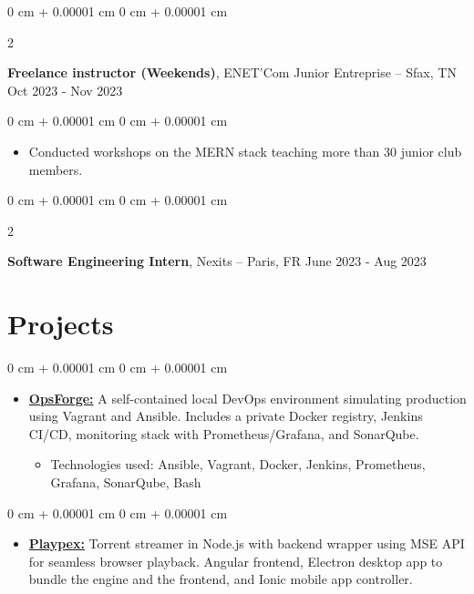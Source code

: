 \documentclass[10pt, letterpaper]{article}
\newenvironment{highlights}{
  \begin{itemize}[
    topsep=0.10 cm,
    parsep=0.10 cm,
    partopsep=0pt,
    itemsep=0pt,
    leftmargin=0 cm + 10pt
    ]
  }{
\end{itemize}
}
\newenvironment{highlightsforbulletentries}{
  \begin{itemize}[
    topsep=0 cm,
    parsep=0.10 cm,
    partopsep=0pt,
    itemsep=0pt,
    leftmargin=10pt
    ]
  }{
\end{itemize}
} %
\newenvironment{onecolentry}{
  \begin{adjustwidth}{
      0 cm + 0.00001 cm
    }{
      0 cm + 0.00001 cm
    }
  }{
  \end{adjustwidth}
} %
\newenvironment{twocolentry}[2][]{
  \onecolentry
  \def\secondColumn{#2}
  \setcolumnwidth{\fill, 4.5 cm}
  \begin{paracol}{2}
  }{
    \switchcolumn \raggedleft \secondColumn
  \end{paracol}
  \end{onecolentry}
} %
\begin{document}
    \begin{twocolentry}{
      Oct 2023 - Nov 2023
    }
  \textbf{Freelance instructor (Weekends)}, ENET’Com Junior Entreprise  -- Sfax, TN\end{twocolentry}

  \vspace{0.10 cm}
  \begin{onecolentry}
    \begin{highlights}

    \item Conducted workshops on the MERN stack teaching more than 30 junior club members.


    \end{highlights}

  \end{onecolentry}




  \begin{twocolentry}{
      June 2023 - Aug 2023
    }
  \textbf{Software Engineering Intern}, Nexits  -- Paris, FR\end{twocolentry}



\section{Projects}

\vspace{0.2 cm}

\begin{onecolentry}
  \begin{highlights}
  \item \textbf{\href{https://ihebbelhadj.vercel.app/projects/devops_playground}{OpsForge:}} A self-contained local DevOps environment simulating production using Vagrant and Ansible. Includes a private Docker registry, Jenkins CI/CD, monitoring stack with Prometheus/Grafana, and SonarQube.
    \begin{highlightsforbulletentries}
    \item Technologies used: Ansible, Vagrant, Docker, Jenkins, Prometheus, Grafana, SonarQube, Bash
    \end{highlightsforbulletentries}
  \end{highlights}
\end{onecolentry}

\begin{onecolentry}
  \begin{highlights}
  \item \textbf{\href{https://ihebbelhadj.vercel.app/projects/torrent-streamer}{Playpex:}} Torrent streamer in Node.js with backend wrapper using MSE API for seamless browser playback. Angular frontend, Electron desktop app to bundle the engine and the frontend, and Ionic mobile app controller.
  \end{highlights}
\end{onecolentry}
\end{document}
